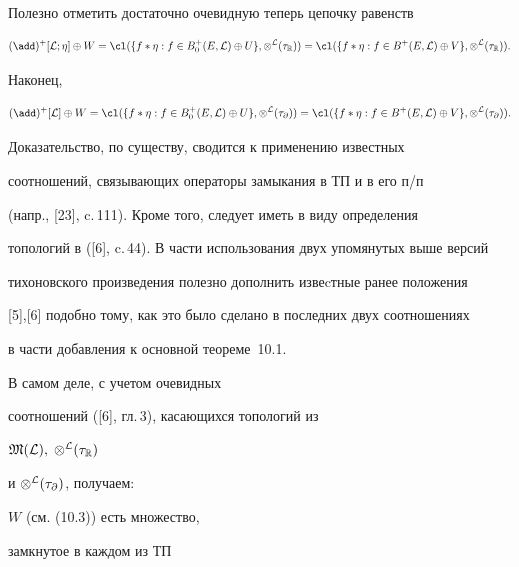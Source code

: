 Полезно отметить достаточно очевидную теперь цепочку равенств


$$


{(\add)^+}[{\cal L};\eta] \oplus W =


{\cl}(\{{f*\eta}:f \in {B_0^+}(E,{\cal L}) \oplus U\},


{{\otimes}^{\cal L}}({\tau_{\Bbb R}})) =


{\cl}(\{{f*\eta}:f \in {B^+}(E,{\cal L}) \oplus V\},


{{\otimes}^{\cal L}}({\tau_{\Bbb R}})).


$$


Наконец,


$$


{(\add)^+}[{\cal L}] \oplus W =


{\cl}(\{{f*\eta}:f \in {B_0^+}(E,{\cal L}) \oplus U\},


{{\otimes}^{\cal L}}({\tau_\partial})) =


{\cl}(\{{f*\eta}:f \in {B^+}(E,{\cal L}) \oplus V\},


{{\otimes}^{\cal L}}({\tau_\partial})).


$$





Доказательство, по существу, сводится к применению известных


соотношений, связывающих операторы замыкания в ТП и в его п/п


(напр., [23], c.\,111). Кроме того, следует иметь в виду определения


топологий в ([6], c.\,44). В части использования двух упомянутых выше версий


тихоновского произведения полезно дополнить извеcтные ранее положения


[5],[6] подобно тому, как это было сделано в последних двух соотношениях


в части добавления к основной теореме~10.1.





В самом деле, с учетом очевидных


соотношений ([6], гл.\,3), касающихся топологий из


${\frak M}({\cal L}),\;{{\otimes}^{\cal L}}({\tau_{\Bbb R}})$


и ${{\otimes}^{\cal L}}({\tau_\partial})$, получаем:


$W$ (см. (10.3)) есть множество,


замкнутое в каждом из ТП


